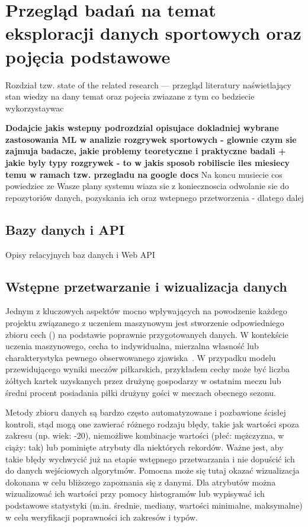 
\chapter{Przegląd badań na temat eksploracji danych sportowych oraz pojęcia podstawowe}

Rozdział tzw. state of the related research --- przegląd literatury naświetlający stan wiedzy na dany temat oraz pojecia zwiazane z tym co bedziecie wykorzystaywac

\textbf{Dodajcie jakis wstepny podrozdzial opisujace dokladniej wybrane zastosowania ML w analizie rozgrywek sportowych - glownie czym sie zajmuja badacze, jakie problemy teoretyczne i praktyczne badali + jakie byly typy rozgrywek - to w jakis sposob robiliscie iles miesiecy temu w ramach tzw. przegladu na google docs}
Na koncu musiecie cos powiedziec ze Wasze plany systemu wiaza sie z koniecznoscia odwolanie sie do repozytoriów danych, pozyskania ich oraz wstepnego przetworzenia - dlatego dalej 

\section{Bazy danych i API}
Opisy relacyjnych baz danych i Web API
\section{Wstępne przetwarzanie i wizualizacja danych}

\noindent 

Jednym z kluczowych aspektów mocno wpływających na powodzenie każdego projektu związanego z uczeniem maszynowym jest stworzenie odpowiedniego zbioru cech () na podstawie poprawnie przygotowanych danych. W kontekście uczenia maszynowego, cecha to indywidualna, mierzalna własność lub charakterystyka pewnego obserwowanego zjawiska~\cite{Wiki:Feature}. W przypadku modelu przewidującego wyniki meczów piłkarskich, przykładem cechy może być liczba żółtych kartek uzyskanych przez drużynę gospodarzy w ostatnim meczu lub średni procent posiadania piłki drużyny gości w meczach obecnego sezonu.

Metody zbioru danych są bardzo często automatyzowane i pozbawione ścisłej kontroli, stąd mogą one zawierać różnego rodzaju błędy, takie jak wartości spoza zakresu (np. wiek: -20), niemożliwe kombinacje wartości (płeć: mężczyzna, w ciąży: tak) lub pominięte atrybuty dla niektórych rekordów. Ważne jest, aby takie błędy wychwycić już na etapie wstępnego przetwarzania i nie dopuścić ich do danych wejściowych algorytmów. Pomocna może się tutaj okazać wizualizacja dokonana w celu bliższego zapoznania się z danymi. Dla atrybutów można wizualizować ich wartości przy pomocy histogramów lub wypisywać ich podstawowe statystyki (m.in. średnie, mediany, wartości minimalne, maksymalne) w celu weryfikacji poprawności ich zakresów i typów.

